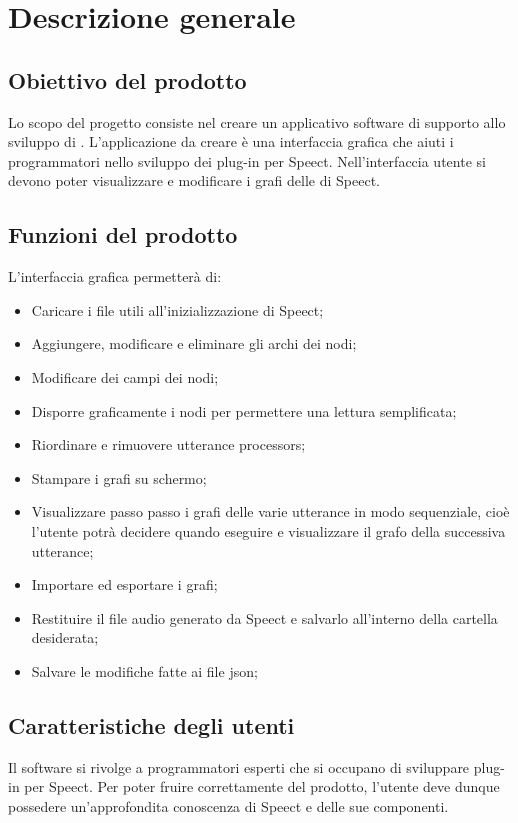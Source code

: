 \documentclass[../AnalisideiRequisiti.tex]{subfiles}
\begin{document}
	
\chapter{Descrizione generale}

\section{Obiettivo del prodotto}

Lo scopo del progetto consiste nel creare un applicativo software di supporto allo sviluppo di . L’applicazione da creare è una interfaccia grafica che aiuti i programmatori nello sviluppo dei plug-in per Speect. Nell’interfaccia utente si devono poter visualizzare e modificare i grafi delle  di Speect. 


\section{Funzioni del prodotto}
L’interfaccia grafica permetterà di:
\begin{itemize}
	\item{} Caricare i file  utili all’inizializzazione di Speect;
	\item{} Aggiungere, modificare e eliminare gli archi dei nodi;
	\item{} Modificare dei campi dei nodi;
	\item{} Disporre graficamente i nodi per permettere una lettura semplificata;
	\item{} Riordinare e rimuovere utterance processors;
	\item{} Stampare i grafi su schermo;
	\item{} Visualizzare passo passo i grafi delle varie utterance in modo sequenziale, cioè l’utente potrà decidere quando eseguire e visualizzare il grafo della successiva utterance;
	\item{} Importare ed esportare i grafi;	
	\item{} Restituire il file audio generato da Speect e salvarlo all'interno della cartella desiderata;
	\item{} Salvare le modifiche fatte ai file json;
\end{itemize}


\section{Caratteristiche degli utenti}
Il software si rivolge a programmatori esperti che si occupano di sviluppare plug-in per Speect. Per poter fruire correttamente del prodotto, l'utente deve dunque possedere un'approfondita conoscenza di Speect e delle sue componenti.
\end{document}
